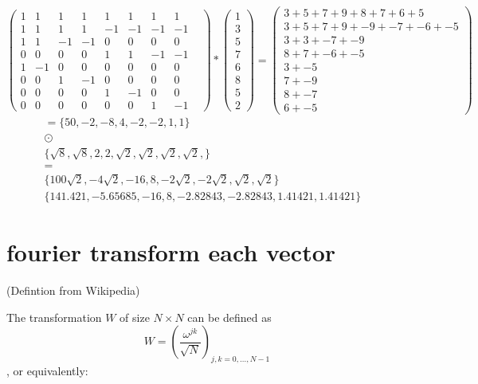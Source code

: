 \documentclass{article}
\begin{document}
\[ 
\begin{pmatrix} 
	1&1&1&1&1&1&1&1 \\ 
	1&1&1&1&-1&-1&-1&-1 \\
	1&1&-1&-1&0&0&0&0& \\ 
	0&0&0&0&1&1&-1&-1 \\ 
	1&-1&0&0&0&0&0&0& \\
	0&0&1&-1&0&0&0&0 \\ 
	0&0&0&0&1&-1&0&0& \\ 
	0&0&0&0&0&0&1&-1 
\end{pmatrix}
*
\begin{pmatrix}
  1 \\
  3 \\
  5 \\
  7 \\
  6 \\
  8 \\
  5 \\
  2 
\end{pmatrix}
=
\begin{pmatrix}
  3 + 5 + 7 + 9 + 8 + 7 + 6 + 5 \\
  3 + 5 + 7 + 9 + -9 + -7 + -6 + -5 \\
  3 + 3 + -7 + -9 \\
  8 + 7 + -6 + -5 \\
  3 + -5 \\
  7 + -9 \\
  8 + -7 \\
  6 + -5
\end{pmatrix}
\]
\begin{align*}
  = \{ 50, -2, -8, 4, -2, -2, 1, 1 \}\\
	\odot&\\
\{ \sqrt{8}, \sqrt{8},2, 2, \sqrt{2}, \sqrt{2}, \sqrt{2}, \sqrt{2}, \} \\
    =&\\
	\{100 \sqrt{2}, -4 \sqrt{2}, -16, 8, -2 \sqrt{2}, -2 \sqrt{2}, \sqrt{2}, \sqrt{2}\}\\ 
	\{141.421, -5.65685, -16, 8, -2.82843, -2.82843, 1.41421, 1.41421\}
\end{align*}


\section{fourier transform each vector}

(Defintion from Wikipedia)

The transformation $W$ of size $N\times N $  can be defined as 
\[W = \left(\frac{\omega^{jk}}{\sqrt{N}}\right)_{j,k=0,\ldots,N-1} \]
, or equivalently:
\end{document}
